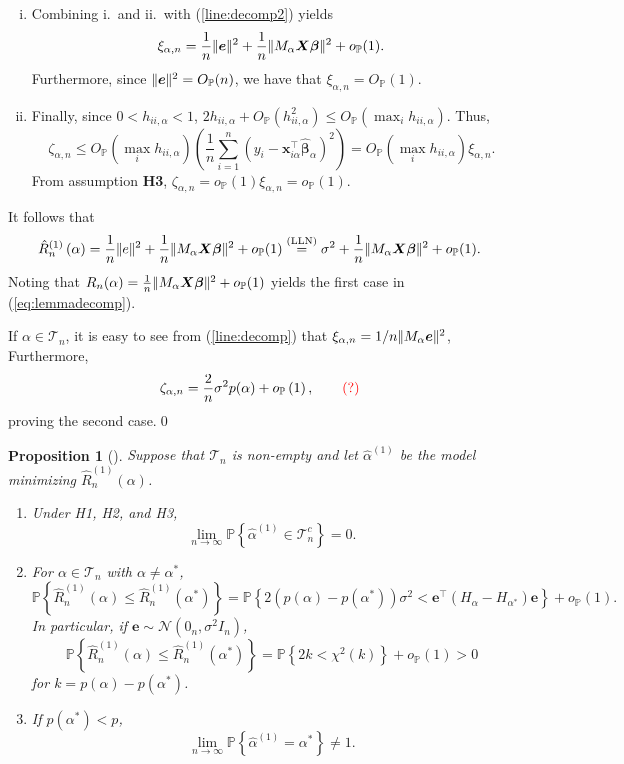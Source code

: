\documentclass[11pt, letter paper]{article}
\newcommand{\1}{\mathmybb{1}}
\newtheorem{proposition}{Proposition}[section]
\newcommand{\0}{\emptyset}
\newcommand{\prob}{\mathbb{P}}
\newcommand{\paren}[1]{\left(#1 \right)}
\newcommand{\set}[1]{\left\{ #1 \right\}}
\newcommand{\norm}[1]{|\hspace{-1pt}|#1 |\hspace{-1pt}|}
\newcommand{\normsq}[1]{\norm{#1}^{2}}
\newcommand{\Tcal}{\mathcal{T}_{n}}
\newcommand{\Ncal}{\mathcal{N}}
\newcommand{\X}{\boldsymbol{X}}
\newcommand{\x}{\boldsymbol{x}}
\newcommand{\e}{\boldsymbol{e}}
\newcommand{\bbeta}{\boldsymbol{\beta}}
\newcommand{\bbetahat}{\boldsymbol{\hat{\beta}}}
\newcommand{\alphahat}[1]{\hat{\alpha}^{#1}}
\newcommand{\lev}{h_{ii,\alpha}}
\newcommand{\loocv}[1]{\hat{R}^{(1)}_{n}\paren{#1}}
\newcommand{\op}[1]{o_{\prob}\paren{#1}}
\newcommand{\Op}[1]{O_{\prob}\paren{#1}}
\begin{document}
\begin{myproofbox}
\begin{enumerate}[i.]
        \item Combining i.\ and ii.\ with (\ref{line:decomp2}) yields \[\xi_{\alpha,n} = \frac{1}{n}\normsq{\e} + \frac{1}{n}\normsq{M_{\alpha}\X\bbeta} + o_{\prob}(1).\] Furthermore, since \(\normsq{\e} = O_{\prob}(n)\), we have that \(\xi_{\alpha,n} = O_{\prob}(1)\).
        \item Finally, since \(0<\lev<1\), \(2\lev + \Op{\lev^{2}}\leq\Op{\max_{i}\lev}\). Thus,
        \[\zeta_{\alpha,n}\leq\Op{\max_{i}\lev}\paren{\frac{1}{n}\sum_{i=1}^{n}\paren{y_{i} - \x_{i\alpha}^{\top}\bbetahat_{\alpha}}^{2}} = \Op{\max_{i}\lev}\xi_{\alpha,n}.\]
        From assumption \textbf{H3}, \(\zeta_{\alpha,n} = o_{\prob}(1)\xi_{\alpha,n} = o_{\prob}(1)\).
    \end{enumerate}
    It follows that 
    \[\loocv{\alpha} = \frac{1}{n}\normsq{e} + \frac{1}{n}\normsq{M_{\alpha}\X\bbeta} + o_{\prob}(1) \stackrel{(\mathrm{LLN})}{=} \sigma^{2} + \frac{1}{n}\normsq{M_{\alpha}\X\bbeta} + o_{\prob}(1).\]
    Noting that \(R_{n}(\alpha) = \frac{1}{n}\normsq{M_{\alpha}\X\bbeta} + o_{\prob}(1)\) yields the first case in (\ref{eq:lemmadecomp}).

    If \(\alpha\in\Tcal\), it is easy to see from (\ref{line:decomp}) that \(\xi_{\alpha,n} = 1/n\normsq{M_{\alpha}\e}\), Furthermore,
    \[\zeta_{\alpha,n} = \frac{2}{n}\sigma^{2}p(\alpha) + \op{1},\qquad\textcolor{red}{(?)}\]
    proving the second case.\qed{}
\end{myproofbox}

\begin{proposition}[\cite{shao_1993}]\label{prop:shao93main}
    Suppose that \(\Tcal\) is non-empty and let \(\alphahat{(1)}\) be the model minimizing \(\loocv{\alpha}\).
    \begin{enumerate}
        \item Under H1, H2, and H3, \[\lim_{n\to\infty}\prob\set{\alphahat{(1)}\in\Tcal^{c}}=0.\]
        \item For \(\alpha\in\Tcal\) with \(\alpha\neq\alpha^{*}\),\[\prob\set{\loocv{\alpha}\leq \loocv{\alpha^{*}}} = \prob\set{2\paren{p(\alpha) - p(\alpha^{*})}\sigma^{2} < \e^{\top}(H_{\alpha} - H_{\alpha^{*}})\e} + \op{1}.\] In particular, if \(\e\sim\Ncal(0_{n}, \sigma^{2}I_n)\), \[\prob\set{\loocv{\alpha}\leq \loocv{\alpha^{*}}} = \prob\set{2k < \chi^{2}(k)} + \op{1} > 0\] for \(k=p(\alpha) - p(\alpha^{*})\).
        \item If \(p(\alpha^*) < p\), \[\lim_{n\to\infty}\prob\set{\alphahat{(1)}=\alpha^{*}}\neq 1.\]
    \end{enumerate}
\end{proposition}
\end{document}
